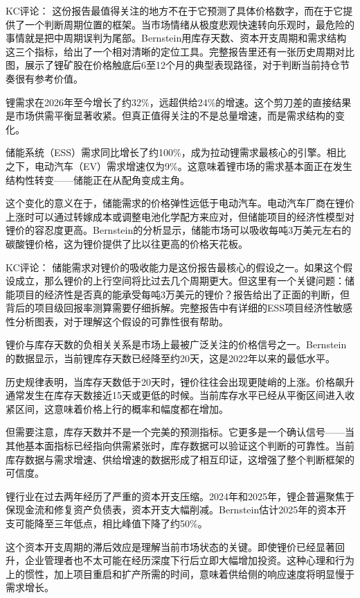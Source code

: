 \documentclass[11pt]{ctexart}
\begin{document}
KC评论： 这份报告最值得关注的地方不在于它预测了具体价格数字，而在于它提供了一个判断周期位置的框架。当市场情绪从极度悲观快速转向乐观时，最危险的事情就是把中周期误判为尾部。Bernstein用库存天数、资本开支周期和需求结构这三个指标，给出了一个相对清晰的定位工具。完整报告里还有一张历史周期对比图，展示了锂矿股在价格触底后6至12个月的典型表现路径，对于判断当前持仓节奏很有参考价值。

锂需求在2026年至今增长了约32\%，远超供给24\%的增速。这个剪刀差的直接结果是市场供需平衡显著收紧。但真正值得关注的不是总量增速，而是需求结构的变化。

储能系统（ESS）需求同比增长了约100\%，成为拉动锂需求最核心的引擎。相比之下，电动汽车（EV）需求增速仅为9\%。这意味着锂市场的需求基本面正在发生结构性转变——储能正在从配角变成主角。

这个变化的意义在于，储能需求的价格弹性远低于电动汽车。电动汽车厂商在锂价上涨时可以通过转嫁成本或调整电池化学配方来应对，但储能项目的经济性模型对锂价的容忍度更高。Bernstein的分析显示，储能市场可以吸收每吨3万美元左右的碳酸锂价格，这为锂价提供了比以往更高的价格天花板。

KC评论： 储能需求对锂价的吸收能力是这份报告最核心的假设之一。如果这个假设成立，那么锂价的上行空间将比过去几个周期更大。但这里有一个关键问题：储能项目的经济性是否真的能承受每吨3万美元的锂价？报告给出了正面的判断，但背后的项目级回报率测算需要仔细拆解。完整报告中有详细的ESS项目经济性敏感性分析图表，对于理解这个假设的可靠性很有帮助。

锂价与库存天数的负相关关系是市场上最被广泛关注的价格信号之一。Bernstein的数据显示，当前锂库存天数已经降至约20天，这是2022年以来的最低水平。

历史规律表明，当库存天数低于20天时，锂价往往会出现更陡峭的上涨。价格飙升通常发生在库存天数接近15天或更低的时候。当前库存水平已经从平衡区间进入收紧区间，这意味着价格上行的概率和幅度都在增加。

但需要注意，库存天数并不是一个完美的预测指标。它更多是一个确认信号——当其他基本面指标已经指向供需紧张时，库存数据可以验证这个判断的可靠性。当前库存数据与需求增速、供给增速的数据形成了相互印证，这增强了整个判断框架的可信度。

锂行业在过去两年经历了严重的资本开支压缩。2024年和2025年，锂企普遍聚焦于保现金流和修复资产负债表，资本开支大幅削减。Bernstein估计2025年的资本开支可能降至三年低点，相比峰值下降了约50\%。

这个资本开支周期的滞后效应是理解当前市场状态的关键。即使锂价已经显著回升，企业管理者也不太可能在经历深度下行后立即大幅增加投资。这种心理和行为上的惯性，加上项目重启和扩产所需的时间，意味着供给侧的响应速度将明显慢于需求增长。
\end{document}
